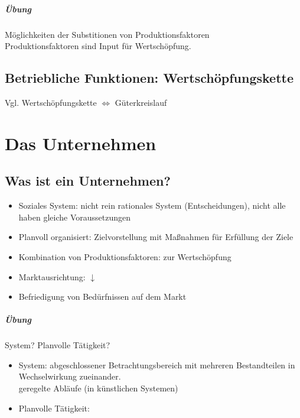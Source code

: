\paragraph{Übung} Möglichkeiten der Substitionen von Produktionsfaktoren\\
Produktionsfaktoren sind Input für Wertschöpfung.

\section{Betriebliche Funktionen: Wertschöpfungskette}
Vgl. Wertschöpfungskette $\Leftrightarrow$ Güterkreislauf

\chapter{Das Unternehmen}
\section{Was ist ein Unternehmen?}
\begin{itemize}
\item Soziales System: nicht rein rationales System (Entscheidungen), nicht alle haben gleiche Voraussetzungen
\item Planvoll organisiert: Zielvorstellung mit Maßnahmen für Erfüllung der Ziele
\item Kombination von Produktionsfaktoren: zur Wertschöpfung
\item Marktausrichtung: $\downarrow$
\item Befriedigung von Bedürfnissen auf dem Markt
\end{itemize}
\paragraph{Übung} System? Planvolle Tätigkeit?
\begin{itemize}
\item System: abgeschlossener Betrachtungsbereich mit mehreren Bestandteilen in Wechselwirkung zueinander.\\
geregelte Abläufe (in künstlichen Systemen)
\item Planvolle Tätigkeit: 
\end{itemize}

